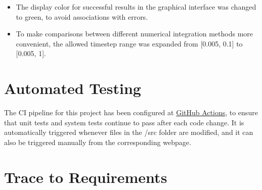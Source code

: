\documentclass[12pt, titlepage]{article}
\begin{document}
\begin{itemize}
\item The display color for successful results in the graphical interface was 
changed to green, to avoid associations with errors.
\item To make comparisons between different numerical integration methods more 
convenient, the allowed timestep range was expanded from [0.005, 0.1] 
to [0.005, 1].
\end{itemize}

\section{Automated Testing}

The CI pipeline for this project has been configured at 
\href{https://github.com/Mei0725/FlockingSimulator/actions/workflows/unity-tests.yml}{GitHub Actions}, 
to ensure that unit tests and system tests continue to pass after each code 
change. It is automatically triggered whenever files in the /src folder are 
modified, and it can also be triggered manually from the corresponding webpage.

\newpage

\section{Trace to Requirements}
\end{document}
